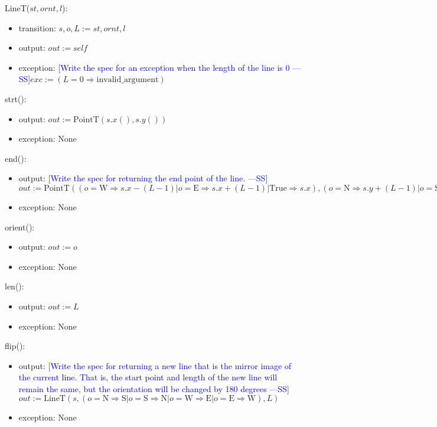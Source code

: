 \documentclass[12pt]{article}
\newcommand{\authornote}[3]{\textcolor{#1}{[#3 ---#2]}}
\newcommand{\authornote}[3]{}
\newcommand{\wss}[1]{\authornote{blue}{SS}{#1}}
\begin{document}
LineT($st, ornt, l$):
\begin{itemize}
\item transition: $s, o, L := st, ornt, l$
\item output: $out := \mathit{self}$
\item exception: \wss{Write the spec for an exception when the length of the line is 0}$exc := (L = 0 \Rightarrow \mathrm{invalid\_argument})$
\end{itemize}

\noindent strt():
\begin{itemize}
\item output: $out := \mbox{PointT}(s.x(), s.y())$
\item exception: None
\end{itemize}

\noindent end():
\begin{itemize}
\item output: \wss{Write the spec for returning the end point of the
    line.}$out := \mbox{PointT}((o = \mbox{W} \Rightarrow s.x - (L-1) | o =
  \mbox{E} \Rightarrow s.x + (L-1) | \mbox{True} \Rightarrow s.x), (o = \mbox{N}
  \Rightarrow s.y + (L-1) | o = \mbox{S} \Rightarrow s.y - (L-1) | \mbox{True}
  \Rightarrow s.y))$

\item exception: None
\end{itemize}

\noindent orient():
\begin{itemize}
\item output: $out := o$
\item exception: None
\end{itemize}

\noindent len():
\begin{itemize}
\item output: $out := L$
\item exception: None
\end{itemize}

\noindent flip():
\begin{itemize}
\item output: \wss{Write the spec for returning a new line that is the mirror
    image of the current line.  That is, the start point and length of the new
    line will remain the same, but the orientation will be changed by 180
    degrees}$out := \mbox{LineT}(s, (o = \mbox{N} \Rightarrow \mbox{S} | o =
  \mbox{S} \Rightarrow \mbox{N} | o = \mbox{W} \Rightarrow \mbox{E} | o =
  \mbox{E} \Rightarrow \mbox{W}), L)$
\item exception: None
\end{itemize}
\end{document}
